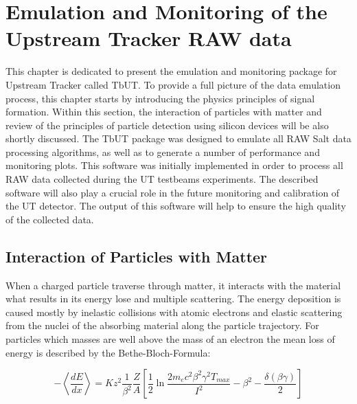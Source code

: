 \chapter{Emulation and Monitoring of the Upstream Tracker RAW data}
\label{chapter:tbut}

This chapter is dedicated to present the emulation and monitoring package for Upstream Tracker called TbUT.
To provide a full picture of the data emulation process, this chapter starts by introducing the physics principles of signal formation. Within this section, the interaction of particles with matter and review of the principles of particle detection using silicon devices will be also shortly discussed.    
The TbUT package was designed to emulate all RAW Salt data processing algorithms, as well as to generate a number of performance and monitoring plots. This software was initially implemented in order to process all RAW data collected during the UT testbeams experiments. The described software will also play a crucial role in the future monitoring and calibration of the UT detector. The output of this software will help to ensure the high quality of the collected data. 


\section{Interaction of Particles with Matter}
\label{sec:Interaction}
When a charged particle traverse through matter, it interacts with the material what results in its energy lose and multiple scattering. The energy deposition is caused mostly by inelastic collisions with atomic electrons and elastic scattering from the nuclei of the absorbing material along the particle trajectory. For particles which masses are well above the mass of an electron the mean loss of energy is described by the Bethe-Bloch-Formula: 

\begin{equation}
\label{eq:Bethe_bloh}
  -\left< \frac{dE}{dx} \right> = K z^2 \frac{1}{\beta^2} \frac{Z}{A} 
  \left[ \frac{1}{2} \ln \frac{2m_e c^2 \beta^2 \gamma^2 T_{max}}{I^2} - \beta^2 - \frac{\delta(\beta \gamma)}{2}
  \right]  
\end{equation}

